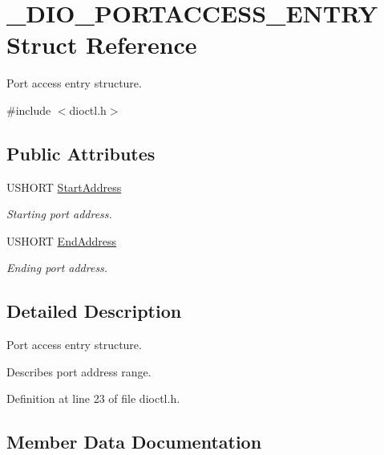 \hypertarget{struct___d_i_o___p_o_r_t_a_c_c_e_s_s___e_n_t_r_y}{}\section{\+\_\+\+D\+I\+O\+\_\+\+P\+O\+R\+T\+A\+C\+C\+E\+S\+S\+\_\+\+E\+N\+T\+RY Struct Reference}
\label{struct___d_i_o___p_o_r_t_a_c_c_e_s_s___e_n_t_r_y}


Port access entry structure.  




{\ttfamily \#include $<$dioctl.\+h$>$}

\subsection*{Public Attributes}
\begin{DoxyCompactItemize}
\item 
U\+S\+H\+O\+RT \mbox{\hyperlink{struct___d_i_o___p_o_r_t_a_c_c_e_s_s___e_n_t_r_y_a3ae3afb8f25d173ff0f76d23c0798469}{Start\+Address}}
\begin{DoxyCompactList}\small\item\em Starting port address. \end{DoxyCompactList}\item 
U\+S\+H\+O\+RT \mbox{\hyperlink{struct___d_i_o___p_o_r_t_a_c_c_e_s_s___e_n_t_r_y_acb936a1cae7e99495491b8c0b6cfe907}{End\+Address}}
\begin{DoxyCompactList}\small\item\em Ending port address. \end{DoxyCompactList}\end{DoxyCompactItemize}


\subsection{Detailed Description}
Port access entry structure. 

Describes port address range.~\newline


Definition at line 23 of file dioctl.\+h.



\subsection{Member Data Documentation}
\mbox{\label{struct___d_i_o___p_o_r_t_a_c_c_e_s_s___e_n_t_r_y_acb936a1cae7e99495491b8c0b6cfe907}} 
